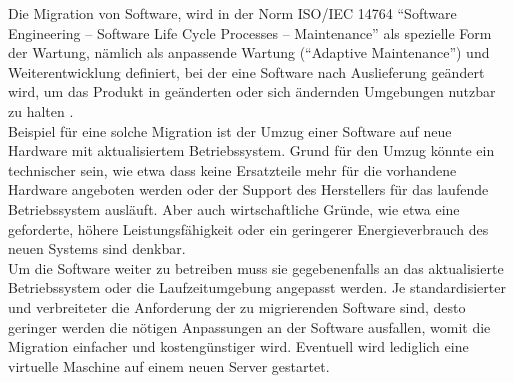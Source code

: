 Die Migration von Software, wird in der Norm ISO/IEC 14764 "`Software
Engineering -- Software Life Cycle Processes -- Maintenance"' als spezielle
Form der Wartung, nämlich als anpassende Wartung ("`Adaptive Maintenance"') und
Weiterentwicklung definiert, bei der eine Software nach Auslieferung geändert
wird, um das Produkt in geänderten oder sich ändernden Umgebungen nutzbar zu
halten . \\
Beispiel für eine solche Migration ist der Umzug einer Software auf neue
Hardware mit aktualisiertem Betriebssystem. Grund für den Umzug könnte ein
technischer sein, wie etwa dass keine Ersatzteile mehr für die vorhandene
Hardware angeboten werden oder der Support des Herstellers für das laufende
Betriebssystem ausläuft. Aber auch wirtschaftliche Gründe, wie etwa eine
geforderte, höhere Leistungsfähigkeit oder ein geringerer Energieverbrauch des
neuen Systems sind denkbar. \\
Um die Software weiter zu betreiben muss sie gegebenenfalls an das
aktualisierte Betriebssystem oder die Laufzeitumgebung angepasst werden.
Je standardisierter und verbreiteter die Anforderung der zu migrierenden
Software sind, desto geringer werden die nötigen Anpassungen an der
Software ausfallen, womit die Migration einfacher und kostengünstiger wird.
Eventuell wird lediglich eine virtuelle Maschine auf einem neuen Server
gestartet. 

